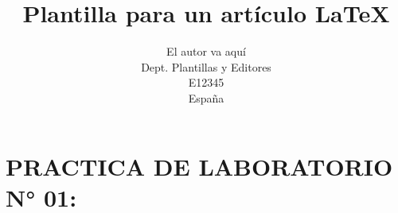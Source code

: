 %
%



\title{Plantilla para un artículo \LaTeX}
\author{El autor va aquí\\
  \small Dept. Plantillas y Editores\\
  \small E12345\\
  \small España
}


\section{PRACTICA DE LABORATORIO N° 01:}
